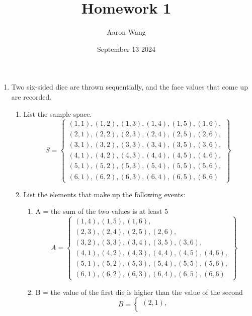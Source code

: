 \documentclass{article}
\title{Homework 1}
\author{Aaron Wang}
\date{September 13 2024}
\begin{document}
\maketitle
    \begin{enumerate}
    \item Two six-sided dice are thrown sequentially, and the face values that come up are recorded.
    \begin{enumerate}
        \item List the sample space.
        \[
            S = \left\{ 
            \begin{array}{l}
            (1,1), (1,2), (1,3), (1,4), (1,5), (1,6), \\
            (2,1), (2,2), (2,3), (2,4), (2,5), (2,6), \\
            (3,1), (3,2), (3,3), (3,4), (3,5), (3,6), \\
            (4,1), (4,2), (4,3), (4,4), (4,5), (4,6), \\
            (5,1), (5,2), (5,3), (5,4), (5,5), (5,6), \\
            (6,1), (6,2), (6,3), (6,4), (6,5), (6,6)
            \end{array}
            \right\}
        \]
        \item List the elements that make up the following events: 
        \begin{enumerate}
            \item A = the sum of the two values is at least 5
            \[
                A = \left\{ 
                \begin{array}{r}
                                     (1,4), (1,5), (1,6), \\
                              (2,3), (2,4), (2,5), (2,6), \\
                       (3,2), (3,3), (3,4), (3,5), (3,6), \\
                (4,1), (4,2), (4,3), (4,4), (4,5), (4,6), \\
                (5,1), (5,2), (5,3), (5,4), (5,5), (5,6), \\
                (6,1), (6,2), (6,3), (6,4), (6,5), (6,6)\:
                \end{array}
                \right\}
            \]
            \item B = the value of the first die is higher than the value of the second
            \[
                B = \left\{ 
                \begin{array}{l}
                (2,1), \\

\end{array}\]
\end{enumerate}
\end{enumerate}
\end{enumerate}
\end{document}
